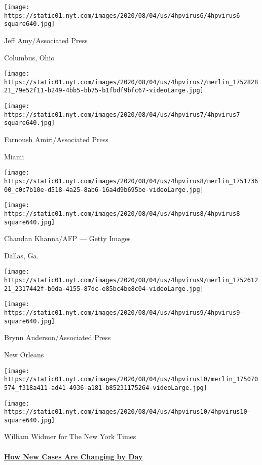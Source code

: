\texttt{[image: https://static01.nyt.com/images/2020/08/04/us/4hpvirus6/4hpvirus6-square640.jpg]}

 Jeff Amy/Associated Press

Columbus, Ohio

\texttt{[image: https://static01.nyt.com/images/2020/08/04/us/4hpvirus7/merlin\_175282821\_79e52f11-b249-4bb5-bb75-b1fbdf9bfc67-videoLarge.jpg]}

\texttt{[image: https://static01.nyt.com/images/2020/08/04/us/4hpvirus7/4hpvirus7-square640.jpg]}

 Farnoush Amiri/Associated Press

Miami

\texttt{[image: https://static01.nyt.com/images/2020/08/04/us/4hpvirus8/merlin\_175173600\_c0c7b10e-d518-4a25-8ab6-16a4d9b695be-videoLarge.jpg]}

\texttt{[image: https://static01.nyt.com/images/2020/08/04/us/4hpvirus8/4hpvirus8-square640.jpg]}

 Chandan Khanna/AFP --- Getty Images

Dallas, Ga.

\texttt{[image: https://static01.nyt.com/images/2020/08/04/us/4hpvirus9/merlin\_175261221\_2317442f-b0da-4155-87dc-e85bc4be8c04-videoLarge.jpg]}

\texttt{[image: https://static01.nyt.com/images/2020/08/04/us/4hpvirus9/4hpvirus9-square640.jpg]}

 Brynn Anderson/Associated Press

New Orleans

\texttt{[image: https://static01.nyt.com/images/2020/08/04/us/4hpvirus10/merlin\_175070574\_f318a411-ad41-4936-a181-b85231175264-videoLarge.jpg]}

\texttt{[image: https://static01.nyt.com/images/2020/08/04/us/4hpvirus10/4hpvirus10-square640.jpg]}

 William Widmer for The New York Times

\hypertarget{how-new-cases-are-changing-by-day}{%
\paragraph{\texorpdfstring{\href{https://www.nytimes.com/interactive/2020/world/coronavirus-maps.html}{How
New Cases Are Changing by
Day}}{How New Cases Are Changing by Day}}\label{how-new-cases-are-changing-by-day}}

\href{https://www.nytimes.com/interactive/2020/us/coronavirus-us-cases.html}{}

